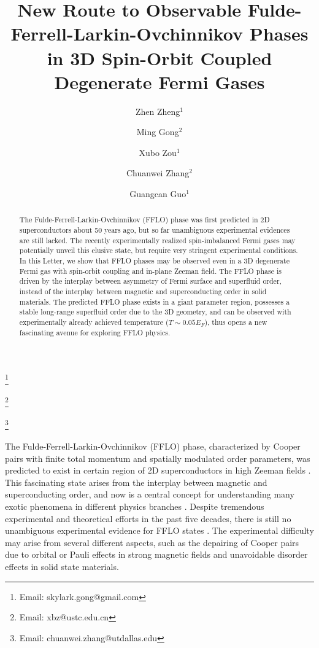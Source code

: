 \documentclass[prl,showpacs,twocolumn]{revtex4}
\begin{document}
\title{New Route to Observable Fulde-Ferrell-Larkin-Ovchinnikov Phases in 3D
Spin-Orbit Coupled Degenerate Fermi Gases}
\author{Zhen Zheng$^{1}$}
\author{Ming Gong$^{2}$}
\thanks{Email: skylark.gong@gmail.com}
\author{Xubo Zou$^{1}$}
\thanks{Email: xbz@ustc.edu.cn}
\author{Chuanwei Zhang$^{2}$}
\thanks{Email: chuanwei.zhang@utdallas.edu}
\author{Guangcan Guo$^{1}$}

\begin{abstract}
The Fulde-Ferrell-Larkin-Ovchinnikov (FFLO) phase was first predicted in 2D
superconductors about 50 years ago, but so far unambiguous experimental
evidences are still lacked. The recently experimentally realized
spin-imbalanced Fermi gases may potentially unveil this elusive state, but
require very stringent experimental conditions. In this Letter, we show that
FFLO phases may be observed even in a 3D degenerate Fermi gas with
spin-orbit coupling and in-plane Zeeman field. The FFLO phase is driven by
the interplay between asymmetry of Fermi surface and superfluid order,
instead of the interplay between magnetic and superconducting order in solid
materials. The predicted FFLO phase exists in a giant parameter region,
possesses a stable long-range superfluid order due to the 3D geometry, and
can be observed with experimentally already achieved temperature ($T\sim
0.05E_{F}$), thus opens a new fascinating avenue for exploring FFLO physics.
\end{abstract}

\maketitle


The Fulde-Ferrell-Larkin-Ovchinnikov (FFLO) phase, characterized by Cooper
pairs with finite total momentum and spatially modulated order parameters,
was predicted to exist in certain region of 2D superconductors in high
Zeeman fields \cite{Ferrell64,Larkin64,Larkin65}. This fascinating state
arises from the interplay between magnetic and superconducting order, and
now is a central concept for understanding many exotic phenomena in
different physics branches \cite{Buzdin,
Croitoru,Yuji,Gloos,Bianchi,Singleton, Lortz,Casalbuoni,Alford}. Despite
tremendous experimental and theoretical efforts in the past five decades,
there is still no unambiguous experimental evidence for FFLO states \cite%
{Casalbuoni}. The experimental difficulty may arise from several different
aspects, such as the depairing of Cooper pairs due to orbital or Pauli
effects in strong magnetic fields and unavoidable disorder effects in solid
state materials.
\end{document}
